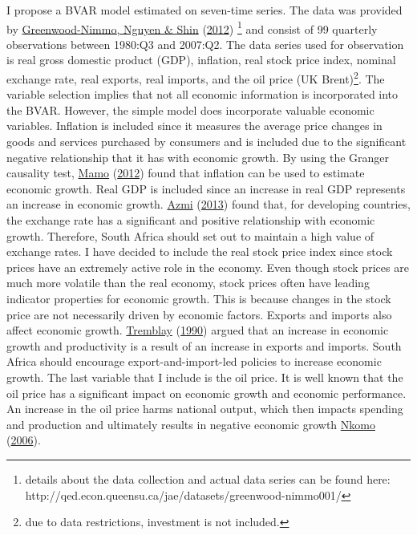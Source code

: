 \documentclass[11pt,preprint, authoryear]{elsarticle}
\numberwithin{equation}{section}
\numberwithin{figure}{section}
\numberwithin{table}{section}
\let\rmarkdownfootnote\footnote%
\def\footnote{\protect\rmarkdownfootnote}
\begin{document}
I propose a BVAR model estimated on seven-time series. The data was
provided by \protect\hyperlink{ref-greenwood}{Greenwood-Nimmo, Nguyen \&
Shin} (\protect\hyperlink{ref-greenwood}{2012})
\footnote{details about the data collection and actual data series can be found here: http://qed.econ.queensu.ca/jae/datasets/greenwood-nimmo001/}
and consist of 99 quarterly observations between 1980:Q3 and 2007:Q2.
The data series used for observation is real gross domestic product
(GDP), inflation, real stock price index, nominal exchange rate, real
exports, real imports, and the oil price (UK
Brent)\footnote{due to data restrictions, investment is not included.}.
The variable selection implies that not all economic information is
incorporated into the BVAR. However, the simple model does incorporate
valuable economic variables. Inflation is included since it measures the
average price changes in goods and services purchased by consumers and
is included due to the significant negative relationship that it has
with economic growth. By using the Granger causality test,
\protect\hyperlink{ref-mamo}{Mamo} (\protect\hyperlink{ref-mamo}{2012})
found that inflation can be used to estimate economic growth. Real GDP
is included since an increase in real GDP represents an increase in
economic growth. \protect\hyperlink{ref-azmi}{Azmi}
(\protect\hyperlink{ref-azmi}{2013}) found that, for developing
countries, the exchange rate has a significant and positive relationship
with economic growth. Therefore, South Africa should set out to maintain
a high value of exchange rates. I have decided to include the real stock
price index since stock prices have an extremely active role in the
economy. Even though stock prices are much more volatile than the real
economy, stock prices often have leading indicator properties for
economic growth. This is because changes in the stock price are not
necessarily driven by economic factors. Exports and imports also affect
economic growth. \protect\hyperlink{ref-trem}{Tremblay}
(\protect\hyperlink{ref-trem}{1990}) argued that an increase in economic
growth and productivity is a result of an increase in exports and
imports. South Africa should encourage export-and-import-led policies to
increase economic growth. The last variable that I include is the oil
price. It is well known that the oil price has a significant impact on
economic growth and economic performance. An increase in the oil price
harms national output, which then impacts spending and production and
ultimately results in negative economic growth
\protect\hyperlink{ref-nkomo}{Nkomo}
(\protect\hyperlink{ref-nkomo}{2006}).
\end{document}
